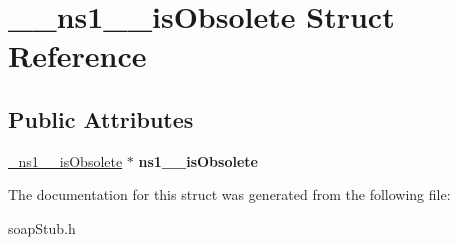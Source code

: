 \hypertarget{struct____ns1____isObsolete}{
\section{\_\-\_\-ns1\_\-\_\-isObsolete Struct Reference}
\label{struct____ns1____isObsolete}
}
\subsection*{Public Attributes}
\begin{DoxyCompactItemize}
\item 
\hypertarget{struct____ns1____isObsolete_a7aca482c2f4e1b448508a24c853da114}{
\hyperlink{class__ns1____isObsolete}{\_\-ns1\_\-\_\-isObsolete} $\ast$ {\bfseries ns1\_\-\_\-isObsolete}}
\label{struct____ns1____isObsolete_a7aca482c2f4e1b448508a24c853da114}

\end{DoxyCompactItemize}


The documentation for this struct was generated from the following file:\begin{DoxyCompactItemize}
\item 
soapStub.h\end{DoxyCompactItemize}

